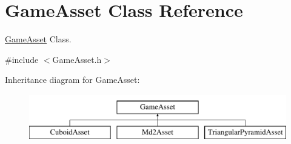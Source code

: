 \hypertarget{classGameAsset}{\section{Game\-Asset Class Reference}
\label{classGameAsset}
}


\hyperlink{classGameAsset}{Game\-Asset} Class.  




{\ttfamily \#include $<$Game\-Asset.\-h$>$}

Inheritance diagram for Game\-Asset\-:\begin{figure}[H]
\begin{center}
\leavevmode
\includegraphics[height=2.000000cm]{classGameAsset}
\end{center}
\end{figure}
